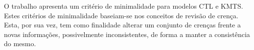 \documentclass[normaltoc,capchap,capsec,times]{abnt}
\begin{document}
O trabalho \cite{aline} apresenta um critério de minimalidade para  modelos CTL e KMTS. Estes critérios de minimalidade baseiam-se nos conceitos de revisão de crença. Esta, por sua vez, tem como finalidade alterar um conjunto de crenças frente a novas informações, possivelmente inconsistentes, de forma a manter a consistência do mesmo.

%
%
%
\end{document}
